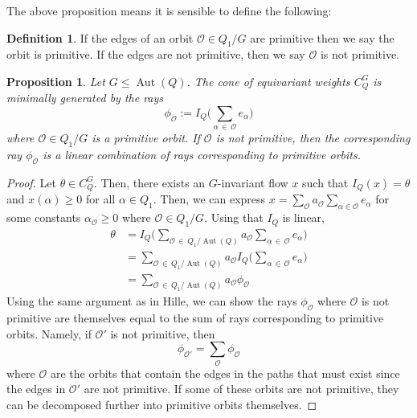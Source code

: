 \documentclass[11pt]{amsart}
\theoremstyle{plain}
\newtheorem{proposition}[theorem]{Proposition}
\theoremstyle{definition}
\newtheorem{definition}[theorem]{Definition}
\DeclareMathOperator{\aut}{Aut}
\begin{document}
The above proposition means it is sensible to define the following:

\begin{definition}
    If the edges of an orbit $\mathcal{O} \in Q_1 / G$ are primitive then we say the orbit is primitive. If the edges are not primitive, then we say $\mathcal{O}$ is not primitive.
\end{definition}

\begin{proposition} \label{equivariant-cone-generators}
    Let $G \leq \aut(Q)$. The cone of equivariant weights $C_Q^G$ is minimally generated by the rays 
\[
\phi_\mathcal{O} := I_Q\Big(\sum_{\alpha \,\in \,\mathcal{O}}e_\alpha\Big) 
\]
    where $\mathcal{O} \in Q_1 / G$ is a primitive orbit. If $\mathcal{O}$ is not primitive, then the corresponding ray $\phi_\mathcal{O}$ is a linear combination of rays corresponding to primitive orbits.
\end{proposition}

\begin{proof}  
    Let $\theta \in C_Q^G$. Then, there exists an $G$-invariant flow $x$ such that $I_Q(x) = \theta$ and $x(\alpha) \geq 0$ for all $\alpha \in Q_1$. Then, we can express $x = \sum_{\mathcal{O}} a_\mathcal{O} \sum_{\alpha \in \mathcal{O}} e_\alpha$ for some constants $\alpha_\mathcal{O} \geq 0$ where $\mathcal{O} \in Q_1/G$. Using that $I_Q$ is linear,
    \begin{align*}
    \theta &= I_Q\Big(\sum_{\mathcal{O} \,\in\, Q_1/\aut(Q)}a_{\mathcal{O}} \sum_{\alpha \,\in\, \mathcal{O}} e_\alpha \Big) \\ 
    &= \sum_{\mathcal{O} \,\in\, Q_1/\aut(Q)}a_{\mathcal{O}} I_Q\Big(\sum_{\alpha \,\in\, \mathcal{O}} e_\alpha \Big) \\
    &= \sum_{\mathcal{O} \,\in\, Q_1/\aut(Q)} a_\mathcal{O}\phi_\mathcal{O}
    \end{align*}
    Using the same argument as in Hille, we can show the rays $\phi_\mathcal{O}$ where $\mathcal{O}$ is not primitive  are themselves equal to the sum of rays corresponding to primitive orbits. Namely, if $\mathcal{O}'$ is not primitive, then
    \[
    \phi_{\mathcal{O}'} = \sum_{\mathcal{O} }\phi_\mathcal{O}
    \]
    where $\mathcal{O}$ are the orbits that contain the edges in the paths that must exist since the edges in $\mathcal{O}'$ are not primitive. If some of these orbits are not primitive, they can be decomposed further into primitive orbits themselves.
\end{proof}
\end{document}
